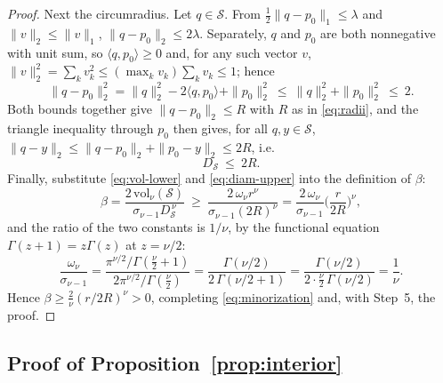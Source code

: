 \documentclass[11pt]{article}
\theoremstyle{plain}
\theoremstyle{definition}
\theoremstyle{remark}
\newcommand{\cS}{\mathcal{S}}
\begin{document}
\begin{proof}
Next the circumradius. Let $q\in\cS$. From $\tfrac12\|q-p_0\|_1\le\lambda$ and
$\|v\|_2\le\|v\|_1$, $\|q-p_0\|_2\le2\lambda$. Separately, $q$ and $p_0$ are both
nonnegative with unit sum, so $\langle q,p_0\rangle\ge0$ and, for any such vector $v$,
$\|v\|_2^2=\sum_kv_k^2\le(\max_kv_k)\sum_kv_k\le1$; hence
\[
    \|q-p_0\|_2^2 = \|q\|_2^2 - 2\langle q,p_0\rangle + \|p_0\|_2^2
    \ \le\ \|q\|_2^2+\|p_0\|_2^2\ \le\ 2 .
\]
Both bounds together give $\|q-p_0\|_2\le R$ with $R$ as in \eqref{eq:radii}, and the
triangle inequality through $p_0$ then gives, for all $q,y\in\cS$,
$\|q-y\|_2\le\|q-p_0\|_2+\|p_0-y\|_2\le2R$, i.e.
\begin{equation}\label{eq:diam-upper}
    D_\cS\ \le\ 2R .
\end{equation}
Finally, substitute \eqref{eq:vol-lower} and \eqref{eq:diam-upper} into the definition of
$\beta$:
\[
    \beta = \frac{2\,\mathrm{vol}_\nu(\cS)}{\sigma_{\nu-1}D_\cS^{\,\nu}}
    \ \ge\ \frac{2\,\omega_\nu r^\nu}{\sigma_{\nu-1}(2R)^\nu}
    = \frac{2\,\omega_\nu}{\sigma_{\nu-1}}\Big(\frac{r}{2R}\Big)^{\nu},
\]
and the ratio of the two constants is $1/\nu$, by the functional equation
$\Gamma(z+1)=z\Gamma(z)$ at $z=\nu/2$:
\[
    \frac{\omega_\nu}{\sigma_{\nu-1}}
    = \frac{\pi^{\nu/2}/\Gamma(\tfrac\nu2+1)}{2\pi^{\nu/2}/\Gamma(\tfrac\nu2)}
    = \frac{\Gamma(\nu/2)}{2\,\Gamma(\nu/2+1)}
    = \frac{\Gamma(\nu/2)}{2\cdot\tfrac\nu2\,\Gamma(\nu/2)}
    = \frac1\nu .
\]
Hence $\beta\ge\frac2\nu(r/2R)^\nu>0$, completing \eqref{eq:minorization} and, with
Step~5, the proof.
\end{proof}

\subsection{Proof of Proposition~\ref{prop:interior}}\label{app:proof-interior}
\end{document}

